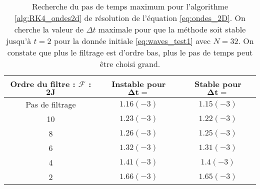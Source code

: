\begin{table}[htbp]
\begin{center}
\begin{tabular}{|c||c|c|}
\hline
\textbf{Ordre du filtre : } $\mathbf{\mathcal{F}}$ : $\mathbf{2J}$  & \textbf{Instable pour} $\mathbf{\Delta t =}$ & \textbf{Stable pour} $\mathbf{\Delta t =}$ \\
\hline
\hline
Pas de filtrage & $1.16(-3)$ & $1.15(-3)$\\
10 & $1.23(-3)$ & $1.22(-3)$ \\
8 & $1.26(-3)$ & $1.25(-3)$ \\
6 & $1.32(-3)$ & $1.31(-3)$ \\
4 & $1.41(-3)$ & $1.4(-3)$ \\
2 & $1.66(-3)$ & $1.65(-3)$ \\
\hline
\end{tabular}
\end{center}
\caption{Recherche du pas de temps maximum pour l'algorithme \ref{alg:RK4_ondes2d} de résolution de l'équation \eqref{eq:ondes_2D}. On cherche la valeur de $\Delta t$ maximale pour que la méthode soit stable jusqu'à $t=2$ pour la donnée initiale \eqref{eq:waves_test1} avec $N=32$. On constate que plus le filtrage est d'ordre bas, plus le pas de temps peut être choisi grand.}
\label{tab:dt_critique_waves}
\end{table} 


